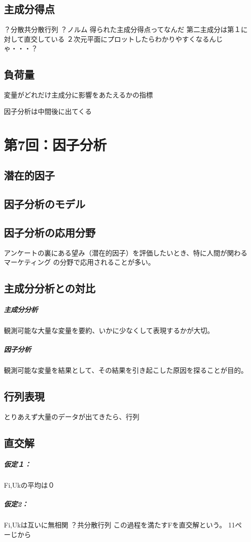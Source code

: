 \documentclass{jsarticle}
\begin{document}
\subsection{主成分得点}
？分散共分散行列
？ノルム
得られた主成分得点ってなんだ
第二主成分は第１に対して直交している
２次元平面にプロットしたらわかりやすくなるんじゃ・・・？

\subsection{負荷量}
変量がどれだけ主成分に影響をあたえるかの指標

因子分析は中間後に出てくる

\section{第7回：因子分析}
\subsection{潜在的因子}
\subsection{因子分析のモデル}
\subsection{因子分析の応用分野}
アンケートの裏にある望み（潜在的因子）を評価したいとき、特に人間が関わるマーケティング
の分野で応用されることが多い。
\subsection{主成分分析との対比}
\subparagraph{主成分分析}
観測可能な大量な変量を要約、いかに少なくして表現するかが大切。
\subparagraph{因子分析}
観測可能な変量を結果として、その結果を引き起こした原因を探ることが目的。
\subsection{行列表現}
とりあえず大量のデータが出てきたら、行列
\subsection{直交解}
\subparagraph{仮定１：}Fi,Ukの平均は０
\subparagraph{仮定2：}Fi,Ukは互いに無相関
？共分散行列
この過程を満たすFを直交解という。
11ぺーじから
\end{document}
